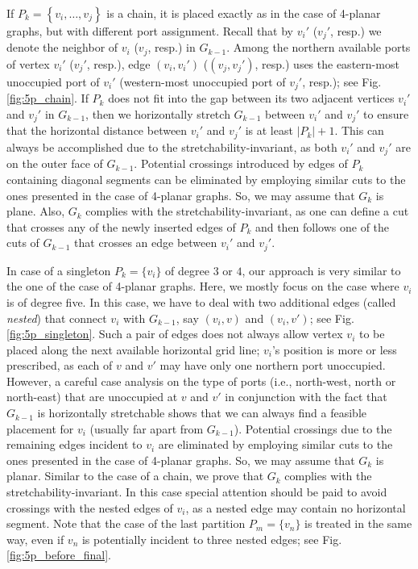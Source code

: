 \documentclass[a4paper,twoside,11pt]{article}
\begin{document}
If $P_k = \left\{v_i,\ldots,v_j\right\}$ is a chain, it is placed
exactly as in the case of 4-planar graphs, but with different port
assignment. Recall that by $v_{i}'$ ($v_{j}'$, resp.) we denote the
neighbor of $v_i$ ($v_j$, resp.) in $G_{k-1}$. Among the northern
available ports of vertex $v_i'$ ($v_{j}'$, resp.), edge $(v_i,
v_i')$ ($(v_j, v_j')$, resp.) uses the eastern-most unoccupied port
of $v_{i}'$ (western-most unoccupied port of $v_{j}'$, resp.); see
Fig.\ref{fig:5p_chain}. If $P_k$ does not fit into the gap between
its two adjacent vertices $v_{i}'$ and $v_{j}'$ in $G_{k-1}$, then
we horizontally stretch $G_{k-1}$ between $v_{i}'$ and $v_{j}'$ to
ensure that the horizontal distance between $v_{i}'$ and $v_{j}'$ is
at least $|P_{k}| + 1$. This can always be accomplished due to the
stretchability-invariant, as both $v_{i}'$ and $v_{j}'$ are on the
outer face of $G_{k-1}$. Potential crossings introduced by edges of
$P_k$ containing diagonal segments can be eliminated by employing
similar cuts to the ones presented in the case of 4-planar graphs.
So, we may assume that $G_{k}$ is plane. Also, $G_{k}$ complies with
the stretchability-invariant, as one can define a cut that crosses
any of the newly inserted edges of $P_k$ and then follows one of the
cuts of $G_{k-1}$ that crosses an edge between $v_{i}'$ and
$v_{j}'$.

In case of a singleton $P_k = \{ v_i \}$ of degree $3$ or $4$, our
approach is very similar to the one of the case of 4-planar graphs.
Here, we mostly focus on the case where $v_i$ is of degree five. In
this case, we have to deal with two additional edges (called
\emph{nested}) that connect $v_i$ with $G_{k-1}$, say $(v_i, v)$ and
$(v_i,v')$; see Fig.\ref{fig:5p_singleton}. Such a pair of edges
does not always allow vertex $v_i$ to be placed along the next
available horizontal grid line; $v_i$'s position is more or less
prescribed, as each of $v$ and $v'$ may have only one northern  port
unoccupied. However, a careful case analysis on the type of ports
(i.e., north-west, north or north-east) that are unoccupied at $v$
and $v'$ in conjunction with the fact that $G_{k-1}$ is horizontally
stretchable shows that we can always find a feasible placement for
$v_i$ (usually far apart from $G_{k-1}$). Potential crossings due to
the remaining edges incident to $v_i$ are eliminated by employing
similar cuts to the ones presented in the case of 4-planar graphs.
So, we may assume that $G_{k}$ is planar. Similar to the case of a
chain, we prove that $G_{k}$ complies with the
stretchability-invariant. In this case special attention should be
paid to avoid crossings with the nested edges of $v_i$, as a nested
edge may contain no horizontal segment. Note that the case of the
last partition $P_m=\{v_n\}$ is treated in the same way, even if
$v_n$ is potentially incident to three nested edges; see
Fig.\ref{fig:5p_before_final}.
\end{document}
